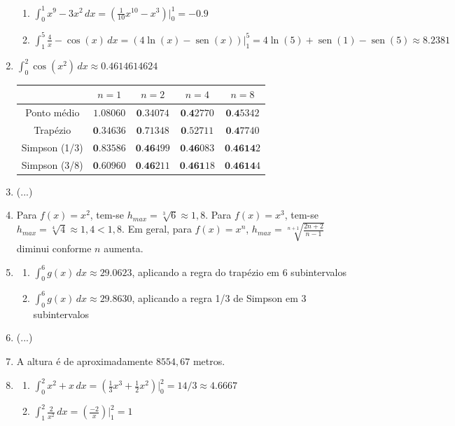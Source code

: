 \documentclass[12pt,a4paper]{article}
\newcommand{\fixme}{{\color{red}(...)}}
\newcommand*\sen{\operatorname{sen}}
\begin{document}
\begin{enumerate}
\begin{enumerate}
\item $\int_0^1 x^9 - 3x^2 \,dx= \left(\frac{1}{10}x^{10} - x^3\right) \Big|_0^1 = -0.9$
\item $\int_1^5 \frac{4}{x} - \cos(x) \,dx = \left( 4\ln(x) - \sen(x)\right) \Big|_1^5 = 4\ln(5) + \sen(1) - \sen(5) \approx 8.2381$
\end{enumerate}
\item $\int_0^2 \cos(x^2)\, dx \approx 0.4614614624$
\begin{center}
\begin{tabular}{|c|c|c|c|c|}
\hline
              & $n=1$     & $n=2$    & $n=4$   & $n=8$ \\ \hline
Ponto médio   & $1.08060$ & $\textbf{0}.34074$ & $\textbf{0.4}2770$ & $\textbf{0.4}5342$ \\ \hline
Trapézio      & $\textbf{0}.34636$ & $\textbf{0}.71348$ & $\textbf{0}.52711$ & $\textbf{0.4}7740$ \\ \hline
Simpson (1/3) & $\textbf{0}.83586$ & $\textbf{0.46}499$ & $\textbf{0.46}083$ & $\textbf{0.4614}2$ \\ \hline
Simpson (3/8) & $\textbf{0}.60960$ & $\textbf{0.46}211$ & $\textbf{0.461}18$ & $\textbf{0.4614}4$ \\ \hline
\end{tabular}
\end{center}
\item \fixme
\item Para $f(x) = x^2$, tem-se $h_{max}=\sqrt[3]{6} \approx 1,8$. Para $f(x) = x^3$, tem-se $h_{max}=\sqrt[4]{4}\approx 1,4 < 1,8$. Em geral, para $f(x) = x^n$, $h_{max}=\sqrt[n+1]{\frac{2n+2}{n-1}}$ diminui conforme $n$ aumenta.
\item
\begin{enumerate}
\item $\int_0^6 g(x)\,dx \approx 29.0623$, aplicando a regra do trapézio em $6$ subintervalos
\item $\int_0^6 g(x)\,dx \approx 29.8630$, aplicando a regra 1/3 de Simpson em $3$ subintervalos
\end{enumerate}
\item \fixme
\item A altura é de aproximadamente $8554,67$ metros.
\item
\begin{enumerate}
\item $\int_0^2 x^2 + x\,dx = \left( \frac{1}{3}x^3 +\frac{1}{2}x^2 \right)\Big|_0^2 = 14/3 \approx 4.6667$
\item $\int_1^2 \frac{2}{x^2}\,dx = \left( \frac{-2}{x} \right)\Big|_1^2 = 1$

\end{enumerate}
\end{enumerate}
\end{document}
